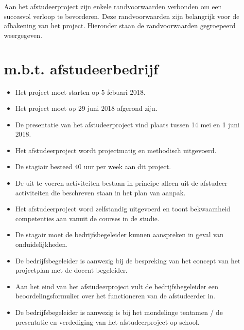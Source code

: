 Aan het afstudeerproject zijn enkele randvoorwaarden verbonden om een succesvol verloop te bevorderen. Deze randvoorwaarden zijn belangrijk voor de afbakening van het project. Hieronder staan de randvoorwaarden gegroepeerd weergegeven.

\section{m.b.t. afstudeerbedrijf}
\begin{itemize}
  \item Het project moet starten op 5 febuari 2018.
  \item Het project moet op 29 juni 2018 afgerond zijn.
  \item De presentatie van het afstudeerproject vind plaats tussen 14 mei en 1 juni 2018.
  \item Het afstudeerproject wordt projectmatig en methodisch uitgevoerd.
  \item De stagiair besteed 40 uur per week aan dit project.
  \item De uit te voeren activiteiten bestaan in principe alleen uit de afstudeer activiteiten die beschreven staan in het plan van aanpak.
  \item Het afstudeerproject word zelfstandig uitgevoerd en toont bekwaamheid competenties aan vanuit de courses in de studie.
  \item De stagair moet de bedrijfsbegeleider kunnen aanspreken in geval van onduidelijkheden.
  \item De bedrijfsbegeleider is aanwezig bij de bespreking van het concept van het projectplan met de docent begeleider.
  \item Aan het eind van het afstudeerproject vult de bedrijfsbegeleider een beoordelingsformulier over het functioneren van de afstudeerder in.
  \item De bedrijfsbegeleider is aanwezig is bij het mondelinge tentamen / de presentatie en verdediging van het afstudeerproject op school.
\end{itemize}

